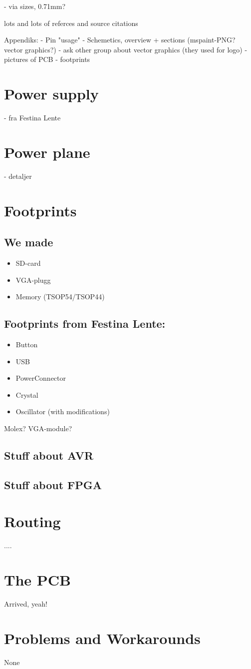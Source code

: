 - via sizes, 0.71mm?

lots and lots of referces and source citations


Appendiks:
- Pin "usage"
- Schemetics, overview + sections (mspaint-PNG? vector graphics?)
- ask other group about vector graphics (they used for logo)
- pictures of PCB
- footprints


\section {Power supply} 
- fra Festina Lente

\section {Power plane}
- detaljer

\section {Footprints}

\subsection {We made}
\begin{itemize}
\item SD-card
\item VGA-plugg
\item Memory (TSOP54/TSOP44)
\end{itemize}

\subsection {Footprints from Festina Lente:}
\begin{itemize}
\item Button
\item USB
\item PowerConnector
\item Crystal
\item Oscillator (with modifications)
\end{itemize}
Molex?
VGA-module?

\subsection {Stuff about AVR}
\subsection {Stuff about FPGA}

\section {Routing}

....

\section {The PCB}

Arrived, yeah!

\section {Problems and Workarounds}

None
